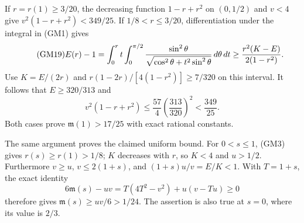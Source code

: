 \documentclass[11pt]{article}
\begin{document}
If $r=r(1)\ge3/20$, the decreasing function $1-r+r^2$ on $(0,1/2)$
and $v<4$ give $v^2(1-r+r^2)<349/25$.
If $1/8<r\le3/20$, differentiation under the integral in (GM1) gives
\begin{equation}\tag{GM19}
 E(r)-1=\int_0^r t\int_0^{\pi/2}
 \frac{\sin^2\theta}{\sqrt{\cos^2\theta+t^2\sin^2\theta}}
 \,d\theta\,d t
 \ge\frac{r^2(K-E)}{2(1-r^2)}.
\end{equation}
Use $K=E/(2r)$ and
$r(1-2r)/[4(1-r^2)]\ge7/320$ on this interval.
It follows that $E\ge320/313$ and
\[
 v^2(1-r+r^2)\le\frac{57}{4}\left(\frac{313}{320}\right)^2
 <\frac{349}{25}.
\]
Both cases prove $\mathfrak m(1)>17/25$ with exact rational constants.

The same argument proves the claimed uniform bound. For $0<s\le1$,
(GM3) gives $r(s)\ge r(1)>1/8$; $K$ decreases with $r$, so $K<4$
and $u>1/2$. Furthermore $v\ge u$, $v\le2(1+s)$, and
$(1+s)u/v=E/K<1$. With $T=1+s$, the exact identity
\begin{equation}\tag{GM20}
 6\mathfrak m(s)-uv=T(4T^2-v^2)+u(v-Tu)\ge0
\end{equation}
therefore gives $\mathfrak m(s)\ge uv/6>1/24$. The assertion is also
true at $s=0$, where its value is $2/3$.
\end{document}
